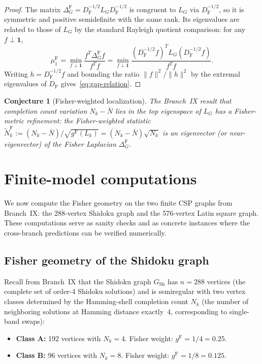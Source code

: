 \documentclass[11pt]{article}
\newcommand{\gF}{g^{\mathrm{F}}}
\newtheorem{conjecture}{Conjecture}
\theoremstyle{remark}
\begin{document}
\begin{proof}
The matrix $\Delta^{\mathrm{F}}_G = D_{\mathrm{F}}^{-1/2} L_G
D_{\mathrm{F}}^{-1/2}$ is congruent to $L_G$ via $D_{\mathrm{F}}^{-1/2}$,
so it is symmetric and positive semidefinite with the same rank.  Its
eigenvalues are related to those of $L_G$ by the standard Rayleigh quotient
comparison: for any $f \perp \mathbf{1}$,
\[
\mu_1^{\mathrm{F}}
= \min_{f \perp \mathbf{1}} \frac{f^T \Delta^{\mathrm{F}}_G f}{f^T f}
= \min_{f \perp \mathbf{1}} \frac{(D_{\mathrm{F}}^{-1/2} f)^T L_G
(D_{\mathrm{F}}^{-1/2} f)}{f^T f}.
\]
Writing $h = D_{\mathrm{F}}^{-1/2} f$ and bounding the ratio
$\|f\|^2 / \|h\|^2$ by the extremal eigenvalues of $D_{\mathrm{F}}$
gives~\eqref{eq:gap-relation}.
\end{proof}

\begin{conjecture}[Fisher-weighted localization]
\label{conj:fisher-localization}
The Branch~IX result that completion count variation $N_k - \bar{N}$ lies in
the top eigenspace of $L_G$ has a Fisher-metric refinement: the
Fisher-weighted statistic
$\tilde{N}_k^{\mathrm{F}} := (N_k - \bar{N}) / \sqrt{\gF(L_k)}
= (N_k - \bar{N}) \sqrt{N_k}$
is an eigenvector (or near-eigenvector) of the Fisher Laplacian
$\Delta^{\mathrm{F}}_G$.
\end{conjecture}


\section{Finite-model computations}
\label{sec:finite-models}

We now compute the Fisher geometry on the two finite CSP graphs from
Branch~IX: the 288-vertex Shidoku graph and the 576-vertex Latin square graph.
These computations serve as sanity checks and as concrete instances where the
cross-branch predictions can be verified numerically.

\subsection{Fisher geometry of the Shidoku graph}

Recall from Branch~IX that the Shidoku graph $G_{\mathrm{Sh}}$ has
$n = 288$ vertices (the complete set of order-4 Shidoku solutions) and is
semiregular with two vertex classes determined by the Hamming-shell
completion count $N_k$ (the number of neighboring solutions at Hamming
distance exactly~$4$, corresponding to single-band swaps):
\begin{itemize}
  \item \textbf{Class A:} 192 vertices with $N_k = 4$.
  Fisher weight: $\gF = 1/4 = 0.25$.
  \item \textbf{Class B:} 96 vertices with $N_k = 8$.
  Fisher weight: $\gF = 1/8 = 0.125$.
\end{itemize}
\end{document}
